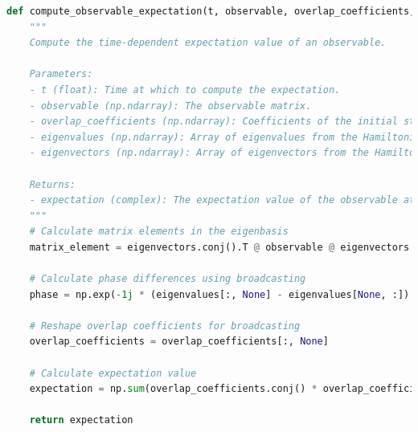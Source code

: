 \documentclass[12pt]{article}
\begin{document}
\begin{lstlisting}[language=Python]
def compute_observable_expectation(t, observable, overlap_coefficients, eigenvalues, eigenvectors):
    """
    Compute the time-dependent expectation value of an observable.
    
    Parameters:
    - t (float): Time at which to compute the expectation.
    - observable (np.ndarray): The observable matrix.
    - overlap_coefficients (np.ndarray): Coefficients of the initial state in the energy eigenbasis.
    - eigenvalues (np.ndarray): Array of eigenvalues from the Hamiltonian diagonalization.
    - eigenvectors (np.ndarray): Array of eigenvectors from the Hamiltonian diagonalization.
    
    Returns:
    - expectation (complex): The expectation value of the observable at time t.
    """
    # Calculate matrix elements in the eigenbasis
    matrix_element = eigenvectors.conj().T @ observable @ eigenvectors

    # Calculate phase differences using broadcasting
    phase = np.exp(-1j * (eigenvalues[:, None] - eigenvalues[None, :]) * t)

    # Reshape overlap coefficients for broadcasting
    overlap_coefficients = overlap_coefficients[:, None]

    # Calculate expectation value
    expectation = np.sum(overlap_coefficients.conj() * overlap_coefficients.T * phase * matrix_element)

    return expectation
\end{lstlisting}
\end{document}
